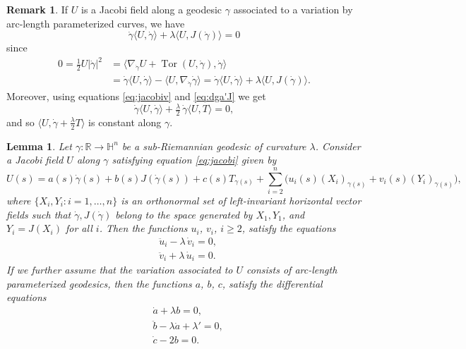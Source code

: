 \documentclass[10pt]{amsart}
\newtheorem{lemma}[theorem]{Lemma}
\theoremstyle{definition}
\newtheorem{remark}[theorem]{Remark}
\theoremstyle{remark}
\numberwithin{equation}{section}
\begin{document}
\begin{remark}
\label{rem:unitspeedjacobi}
If $U$ is a Jacobi field along a geodesic ${\gamma}$ associated to a variation by arc-length parameterized curves, we have
\begin{equation}
\label{eq:dga'J}
{\dot{\gamma}}{\langle{U,{\dot{\gamma}}}\rangle}+{\lambda}{\langle{U,J({\dot{\gamma}})}\rangle}=0
\end{equation}
since
\begin{align*}
0=\tfrac{1}{2} U|{\dot{\gamma}}|^2&={\langle{\nabla_{\dot{\gamma}} U+\operatorname{Tor}(U,{\dot{\gamma}}),{\dot{\gamma}}}\rangle}
\\
&={\dot{\gamma}}{\langle{U,{\dot{\gamma}}}\rangle}-{\langle{U,\nabla_{\dot{\gamma}}{\dot{\gamma}}}\rangle}={\dot{\gamma}}{\langle{U,{\dot{\gamma}}}\rangle}+{\lambda}{\langle{U,J({\dot{\gamma}})}\rangle}.
\end{align*}
Moreover, using equations \eqref{eq:jacobiv} and \eqref{eq:dga'J} we get
\begin{equation}
\label{eq:dgat}
{\dot{\gamma}}{\langle{U,{\dot{\gamma}}}\rangle}+\tfrac{\lambda}{2}\,{\dot{\gamma}}{\langle{U,T}\rangle}=0,
\end{equation}
and so ${\langle{U,{\dot{\gamma}}+\tfrac{\lambda}{2}T}\rangle}$ is constant along ${\gamma}$.
\end{remark}

\begin{lemma}
\label{lem:jacobi-2}
Let ${\gamma}:{{\mathbb{R}}}\to{{\mathbb{H}}}^n$ be a sub-Riemannian geodesic of curvature ${\lambda}$. Consider a Jacobi field $U$ along ${\gamma}$ satisfying equation \eqref{eq:jacobi} given by
\[
U(s)=a(s){\dot{\gamma}}(s)+b(s)J({\dot{\gamma}}(s))+c(s)T_{{\gamma}(s)}+\sum_{i=2}^n \big( u_{i}(s)(X_{i})_{{\gamma}(s)}+v_{i}(s)(Y_{i})_{{\gamma}(s)}\big),
\]
where $\{X_{i}, Y_{i}:i=1,\ldots,n\}$ is an orthonormal set of left-invariant horizontal vector fields such that ${\dot{\gamma}}, J({\dot{\gamma}})$ belong to the space generated by $X_{1}, Y_1$, and $Y_{i}=J(X_{i})$ for all $i$. Then the functions $u_i$, $v_i$, $i{\geqslant} 2$, satisfy the equations
\begin{equation}
\label{eq:uivi}
\begin{split}
&\ddot{u}_{i}-{\lambda}\,\dot{v}_{i}=0,
\\
&\ddot{v}_{i}+{\lambda}\,\dot{u}_{i}=0.
\end{split}
\end{equation}
If we further assume that the variation associated to $U$ consists of arc-length parameterized geodesics, then the functions $a$, $b$, $c$, satisfy the differential equations
\begin{equation}
\label{eq:jacobiequations}
\begin{split}
&\dot{a}+{\lambda} b=0,
\\
&\ddot{b}-{\lambda}\dot{a}+{\lambda}'=0,
\\
&\dot{c}-2b=0.
\end{split}
\end{equation}

\end{lemma}
\end{document}
